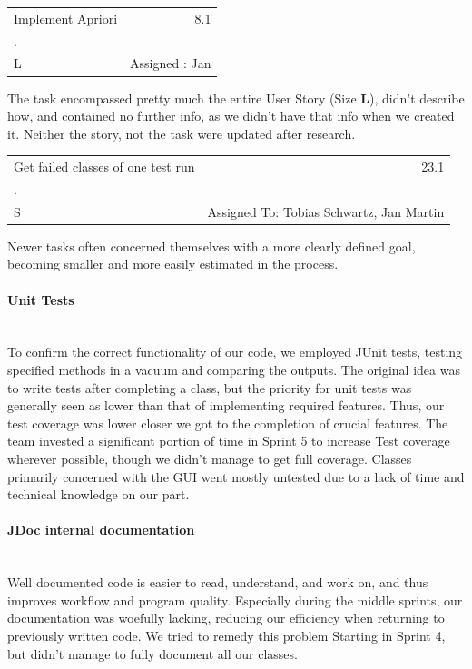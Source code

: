 \begin{table}
  \label{Example Task 1: 8.1}
  \centering
	\begin{tabular}[!th]{ |p{3.5cm} p{2.7cm}| }
	\hline
	Implement Apriori \hfill \break & \multicolumn{1}{r}{8.1} \\
	 . & \\
	 \hfill \break
	 L & \hfill \break Assigned : Jan \\
	 \hline
	\end{tabular}
\end{table}

The task encompassed pretty much the entire User Story (Size \textbf{L}), didn't describe how, and contained no further info, as we didn't have that info when we created it. Neither the story, not the task were updated after research.

\begin{table}
  \label{Example Task 2: 23.1}
  \centering
	\begin{tabular}[!h]{ |p{3.5cm} p{2.7cm}| }
	\hline
	Get failed classes of one test run & \multicolumn{1}{r}{23.1} \\
	 . & \\
	 \hfill \break \break
	 S & Assigned To: \break Tobias Schwartz, \break Jan Martin \\
	 \hline
	\end{tabular}
\end{table}
Newer tasks often concerned themselves with a more clearly defined goal, becoming smaller and more easily estimated in the process. 

\paragraph{Unit Tests}
\ \\
To confirm the correct functionality of our code, we employed JUnit tests, testing specified methods in a vacuum and comparing the outputs. 
The original idea was to write tests after completing a class, but the priority for unit tests was generally seen as lower than that of implementing required features. Thus, our test coverage was lower closer we got to the completion of crucial features. 
The team invested a significant portion of time in Sprint 5 to increase Test coverage wherever possible, though we didn't manage to get full coverage. 
Classes primarily concerned with the GUI went mostly untested due to a lack of time and technical knowledge on our part. 

\paragraph{JDoc internal documentation}
\ \\
Well documented code is easier to read, understand, and work on, and thus improves workflow and program quality. Especially during the middle sprints, our documentation was woefully lacking, reducing our efficiency when returning to previously written code. We tried to remedy this problem Starting in Sprint 4, but didn't manage to fully document all our classes.

